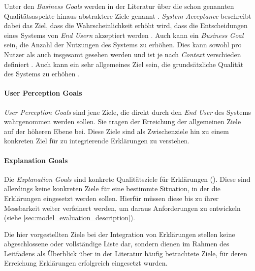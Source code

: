 Unter den \textit{Business Goals} werden in der Literatur über die schon genannten Qualitätsaspekte hinaus abstraktere Ziele genannt \cite[vgl. z.~B.][]{cirqueira_scenario-based_2020, nunes_systematic_2017, ribera2019can}. \textit{System Acceptance} beschreibt dabei das Ziel, dass die Wahrscheinlichkeit erhöht wird, dass die Entscheidungen eines Systems von \textit{End Usern} akzeptiert werden \cite{cirqueira_scenario-based_2020}. Auch kann ein \textit{Business Goal} sein, die Anzahl der Nutzungen des Systems zu erhöhen. Dies kann sowohl pro Nutzer als auch insgesamt gesehen werden und ist je nach \textit{Context} verschieden definiert \cite{nunes_systematic_2017}. Auch kann ein sehr allgemeines Ziel sein, die grundsätzliche Qualität des Systems zu erhöhen \cite{schneider2012abenteuer}.

\paragraph{User Perception Goals} \textit{User Perception Goals} sind jene Ziele, die direkt durch den \textit{End User} des Systems wahrgenommen werden sollen. Sie tragen der Erreichung der allgemeinen Ziele auf der höheren Ebene bei. Diese Ziele sind als Zwischenziele hin zu einem konkreten Ziel für zu integrierende Erklärungen zu verstehen.

\paragraph{Explanation Goals} Die \textit{Explanation Goals} sind \glqq konkrete Qualitätsziele\grqq{} für Erklärungen (\cite[vgl.][]{schneider2012abenteuer}). Diese sind allerdings keine konkreten Ziele für eine bestimmte Situation, in der die Erklärungen eingesetzt werden sollen. Hierfür müssen diese bis zu ihrer Messbarkeit weiter verfeinert werden, um daraus Anforderungen zu entwickeln (siehe \autoref{sec:model_evaluation_description}).

\bigskip

Die hier vorgestellten Ziele bei der Integration von Erklärungen stellen keine abgeschlossene oder vollständige Liste dar, sondern dienen im Rahmen des Leitfadens als Überblick über in der Literatur häufig betrachtete Ziele, für deren Erreichung Erklärungen erfolgreich eingesetzt wurden.

\newpage

\smallskip

\noindent{}

